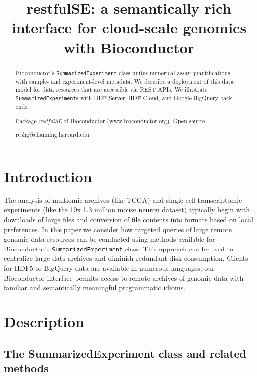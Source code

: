 \documentclass[applications]{gen-bioinformatics}
\author[1]{\pfnm{Shweta}
  \pinit{}
  \psnm{Gopaulakrishnan}}
\author[1]{\pfnm{Samuela}
  \pinit{}
  \psnm{Pollack}}
\author[1]{\pfnm{Benjamin}
  \pinit{}
  \psnm{Stubbs}}
\author[2]{\pfnm{Herv\'e}
  \pinit{}
  \psnm{Pag\`es}}
\author[3]{\pfnm{John}
  \pinit{}
  \psnm{Readey}}
\author[4]{\pfnm{Sean}
  \pinit{}
  \psnm{Davis}}
\author[5]{\pfnm{Levi}
  \pinit{}
  \psnm{Waldron}}
\author[6]{\pfnm{Martin}
  \pinit{T}
  \psnm{Morgan}}
\author[1]{\pfnm{Vincent}
  \pinit{J}
  \psnm{Carey}}
\newcommand{\Rpackage}[1]{{\textit{#1}}}
\begin{document}
\title{restfulSE: a semantically rich interface for cloud-scale genomics
with Bioconductor}
\maketitle

\begin{abstract}
\begin{subabstract}[Summary]
Bioconductor's \verb+SummarizedExperiment+ class
unites numerical assay quantifications with sample- and
experiment-level metadata.  We describe a deployment
of this data model for data resources that are accessible
via REST APIs.  We illustrate \verb+SummarizedExperiment+s with
HDF Server, HDF Cloud, and Google BigQuery back ends.
\end{subabstract}
\begin{subabstract}[Availability] Package \Rpackage{restfulSE} of Bioconductor
 (\url {www.bioconductor.org}). Open source.
\end{subabstract}
\begin{subabstract}[Contact]reshg@channing.harvard.edu
\end{subabstract}
\end{abstract}
\section*{Introduction}

The analysis of multiomic archives (like TCGA) and single-cell
transcriptomic experiments (like the 10x 1.3 million mouse neuron
dataset) typically begin with downloads of large files and
conversion of file contents into formats based on local preferences.
In this paper we consider how targeted queries of large remote
genomic data resources can be conducted using methods available
for Bioconductor's \verb+SummarizedExperiment+ class.
This approach can be used to centralize
large data archives and diminish redundant disk
consumption.  Clients for HDF5 or BigQuery data are available in
numerous languages; our Bioconductor interface permits access to
remote archives of genomic data with
familiar and semantically meaningful programmatic idioms.

\section*{Description}

\subsection*{The SummarizedExperiment class and related methods}
\end{document}
